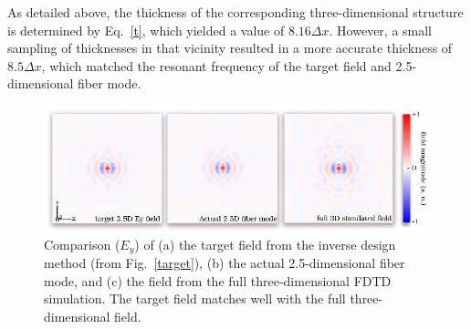 As detailed above, the thickness of the corresponding three-dimensional structure is determined by Eq.~\ref{t}, which yielded a value of $8.16 \Delta x$. However, a small sampling of thicknesses in that vicinity resulted in a more accurate thickness of $8.5\Delta x$, which matched the resonant frequency of the target field and 2.5-dimensional fiber mode.
\begin{figure}[hbt]
\centering\includegraphics[width=\textwidth]{p2/compare}
\caption{Comparison ($E_y$) of (a) the target field from the inverse design method (from Fig.~\ref{target}), (b) the actual 2.5-dimensional fiber mode, and (c) the field from the full three-dimensional FDTD simulation. The target field matches well with the full three-dimensional field.}\label{comp}
\end{figure}

